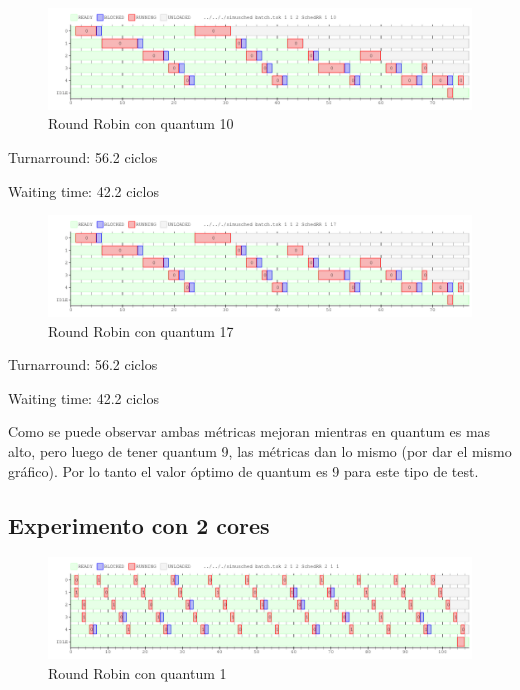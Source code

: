 \begin{figure}[H]
\begin{center}
\includegraphics[width=1.1\textwidth]{img/core1q10.png}
     \caption{Round Robin con quantum 10}
\end{center}
\end{figure}

Turnarround: 56.2 ciclos

Waiting time: 42.2 ciclos 

\begin{figure}[H]
\begin{center}
\includegraphics[width=1.1\textwidth]{img/core1q17.png}
     \caption{Round Robin con quantum 17}
\end{center}
\end{figure}

Turnarround: 56.2 ciclos

Waiting time: 42.2 ciclos

Como se puede observar ambas métricas mejoran mientras en quantum es mas alto, pero luego de tener quantum 9, las métricas dan lo mismo (por dar el mismo gráfico). Por lo tanto el valor óptimo de quantum es 9 para este tipo de test.

\subsection{Experimento con 2 cores}

\begin{figure}[H]
\begin{center}
\includegraphics[width=1.1\textwidth]{img/core2q1.png}
     \caption{Round Robin con quantum 1}
\end{center}
\end{figure}


